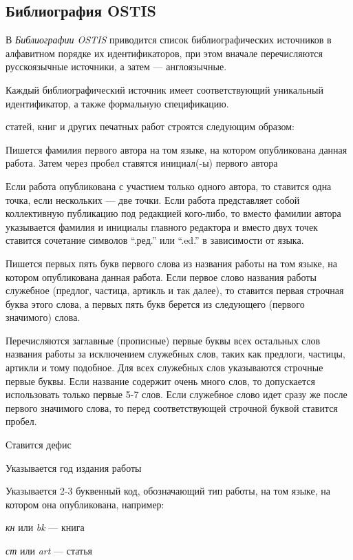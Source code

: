 %

\begin{partbacktext}
\part*{Библиография OSTIS}
\label{part_biblio}

В \textit{Библиографии OSTIS} приводится список библиографических источников в алфавитном порядке их идентификаторов, при этом вначале перечисляются русскоязычные источники, а затем --- англоязычные.

Каждый библиографический источник имеет соответствующий уникальный идентификатор, а также формальную спецификацию.

 статей, книг и других печатных работ строятся следующим образом:

\begin{textitemize}
	\item Пишется фамилия первого автора на том языке, на котором опубликована данная работа. Затем через пробел ставятся инициал(-ы) первого автора
	\item Если работа опубликована с участием только одного автора, то ставится одна точка, если нескольких --- две точки. Если работа представляет собой коллективную публикацию под редакцией кого-либо, то вместо фамилии автора указывается фамилия и инициалы главного редактора и вместо двух точек ставится сочетание символов ``.ред.'' или ``.ed.'' в зависимости от языка.
	\item Пишется первых пять букв первого слова из названия работы на том языке, на котором опубликована данная работа. Если первое слово названия работы служебное (предлог, частица, артикль и так далее), то ставится первая строчная буква этого слова, а первых пять букв берется из следующего (первого значимого) слова.
	\item Перечисляются заглавные (прописные) первые буквы всех остальных слов названия работы за исключением служебных слов, таких как предлоги, частицы, артикли и тому подобное. Для всех служебных слов указываются строчные первые буквы. Если название содержит очень много слов, то допускается использовать только первые 5-7 слов. Если служебное слово идет сразу же после первого значимого слова, то перед соответствующей строчной буквой ставится пробел.
	\item Ставится дефис
	\item Указывается год издания работы
	\item Указывается 2-3 буквенный код, обозначающий тип работы, на том языке, на котором она опубликована, например:
	\begin{textitemize}
		\item \textit{кн} или \textit{bk} --- книга
		\item \textit{ст} или \textit{art} --- статья
	\end{textitemize}
\end{textitemize}


\end{partbacktext}
